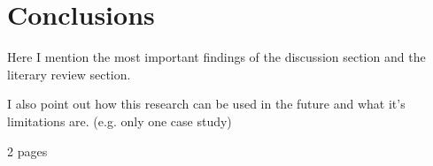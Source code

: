 
\chapter{Conclusions}
\label{chapter:conclusions}

Here I mention the most important findings of the discussion section and the literary review section.

I also point out how this research can be used in the future and what it's limitations are. (e.g. only one case study)

2 pages 
